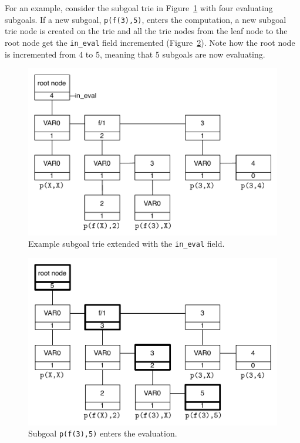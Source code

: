For an example, consider the subgoal trie in Figure~\ref{fig:in_eval_trie} with four evaluating
subgoals. If a new subgoal, \texttt{p(f(3),5)}, enters the computation, a new subgoal trie
node is created on the trie and all the trie nodes from the leaf node to the root node
get the \texttt{in\_eval} field incremented (Figure~\ref{fig:in_eval_add}). Note how the
root node is incremented from 4 to 5, meaning that 5 subgoals are now evaluating.

\begin{figure}[ht]
  \centering
    \includegraphics[scale=0.6]{in_eval_trie.pdf}
  \caption{Example subgoal trie extended with the \texttt{in\_eval} field.}
  \label{fig:in_eval_trie}
\end{figure}

\begin{figure}[ht]
  \centering
    \includegraphics[scale=0.6]{in_eval_add.pdf}
  \caption{Subgoal \texttt{p(f(3),5)} enters the evaluation.}
  \label{fig:in_eval_add}
\end{figure}

